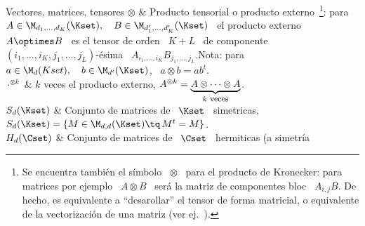 \begin{notation}{Vectores, matrices, tensores}
\hline
%
%
$\otimes$  &  Producto   tensorial  o  producto  externo~\footnote{Se  encuentra
  tambi\'en  el s\'imbolo  \ $\otimes$  \ para  el producto  de  Kronecker: para
  matrices por ejemplo \ $A \otimes B$  \ ser\'a la matriz de componentes bloc \
  $A_{i,j}  B$. De hecho,  es equivalente  a ``desarollar''  el tensor  de forma
  matricial,   o  equivalente  de   la  vectorizaci\'on   de  una   matriz  (ver
  ej.~\cite{MagNeu79}).}:  para $A \in  \M_{d_1,\ldots,d_K}(\Kset), \quad  B \in
\M_{d'_1,\ldots,d'_K}(\Kset)$ \  el producto  externo \ $A  \optimes B$ \  es el
tensor      de      orden      \      $K+L$     \      de      componente      \
$(i_1,\ldots,i_K,j_1,\ldots,j_L)$-\'esima          \         $A_{i_1,\ldots,i_K}
B_{j_1,\ldots,j_L} $.\vspace{1mm}\newline Nota: para \ $a \in \M_d(Kset), \quad
b \in \M_{d'}(\Kset)$, \ $a \otimes b = a b^t$.\\[2.5mm]
\hline
%
$\cdot^{\otimes k}$ & $k$ veces el producto externo, $A^{\otimes k}
= \underbrace{A \otimes \cdots \otimes A}_{k \:\, \mbox{\footnotesize
veces}}$.\\[2.5mm]
\hline
%
$S_d(\Kset)$ & Conjunto de matrices de \ $\Kset$ \ simetricas, \quad $S_d(\Kset) =
\left\{ M \in \M_{d,d}(\Kset) \tq \, M^t = M \right\}$.\\[2.5mm]
\hline
%
$H_d(\Cset)$ & Conjunto de matrices de \ $\Cset$ \ hermiticas (a simetr\'ia

\end{notation}
